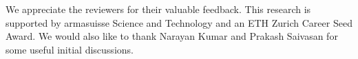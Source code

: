 \begin{acks}
    We appreciate the  reviewers for their valuable feedback. This research is supported by armasuisse Science and Technology and an ETH Zurich Career Seed Award. We would also like to thank Narayan Kumar and Prakash Saivasan for some useful initial discussions.
\end{acks}
